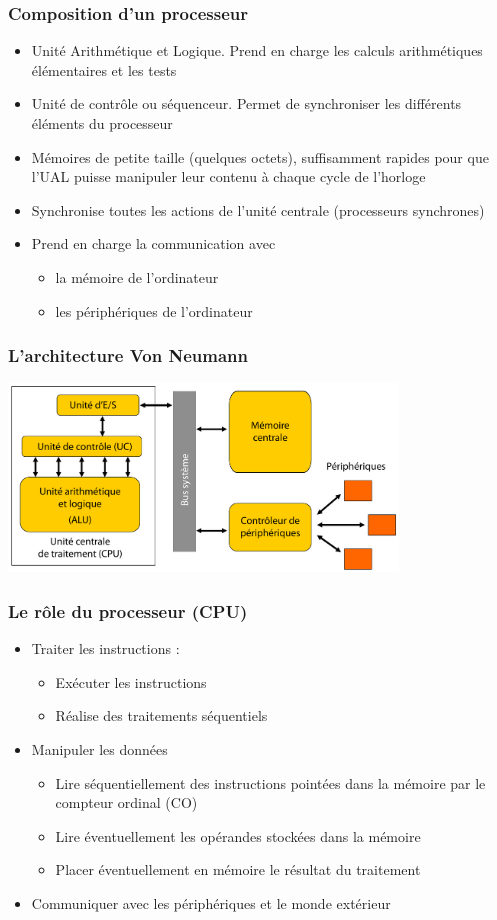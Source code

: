 \begin{frame}
\frametitle{Composition d'un processeur}
\begin{itemize}
\item <1> [ALU] Unité Arithmétique et Logique. Prend en charge les calculs arithmétiques élémentaires et les tests \cite{wp-cpu}
\item <2> [UC] Unité de contrôle ou séquenceur. Permet de synchroniser les différents éléments du processeur
\item <3> [Registres] Mémoires de petite taille (quelques octets), suffisamment rapides pour que l'UAL puisse manipuler leur contenu à chaque cycle de l’horloge
\item <4> [Horloge] Synchronise toutes les actions de l’unité centrale (processeurs synchrones)
\item <5> [Unité E/S] Prend en charge la communication avec 
\begin{itemize}
\item la mémoire de l’ordinateur
\item les périphériques de l’ordinateur
\end{itemize}
\end{itemize}

\end{frame}

\begin{frame}
\frametitle{L'architecture Von Neumann}
\includegraphics[height=5cm]{../illustration/archi_von_neumann.pdf}
\end{frame}

\begin{frame}
\frametitle{Le rôle du processeur (CPU)}
\begin{itemize}
\item Traiter les instructions :
\begin{itemize}
\item Exécuter les instructions
\item Réalise des traitements séquentiels
\end {itemize}
\item Manipuler les données
\begin{itemize}
\item Lire séquentiellement des instructions pointées dans la mémoire par le compteur ordinal (CO)
\item Lire éventuellement les opérandes stockées dans la mémoire
\item Placer éventuellement en mémoire le résultat du traitement
\end{itemize}
\item Communiquer avec les périphériques et le monde extérieur
\end{itemize}
\end{frame}


